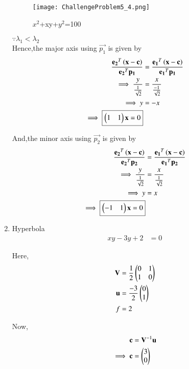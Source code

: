 \documentclass[journal,12pt,twocolumn]{IEEEtran}
\begin{document}
\begin{enumerate}
    \begin{figure}[!ht]
    \centering
    \texttt{[image: ChallengeProblem5\_4.png]}
    \caption{$x^2$+xy+$y^2$=100}
    \label{ex4}	
    \end{figure}
    
    $\because \lambda_1<\lambda_2$ \\
    Hence,the major axis using $\vec{p_1}$ is given by
    \begin{align}
        \frac{\mathbf{e_2}^T\left(\mathbf{x}-\mathbf{c}\right)}{{\mathbf{e_2}^T\mathbf{p_1}}} &= \frac{\mathbf{e_1}^T\left(\mathbf{x}-\mathbf{c}\right)}{{\mathbf{e_1}^T\mathbf{p_1}}}\\
        \implies \frac{y}{\frac{1}{\sqrt{2}}} &= \frac{x}{\frac{-1}{\sqrt{2}}} \\
        \implies y &= -x \\
        \implies \boxed{\begin{pmatrix}1 & 1\end{pmatrix}\mathbf{x} = 0}
    \end{align}
    
    And,the minor axis using $\vec{p_2}$ is given by
    \begin{align}
        \frac{\mathbf{e_2}^T\left(\mathbf{x}-\mathbf{c}\right)}{{\mathbf{e_2}^T\mathbf{p_2}}} &= \frac{\mathbf{e_1}^T\left(\mathbf{x}-\mathbf{c}\right)}{{\mathbf{e_1}^T\mathbf{p_2}}}\\
        \implies \frac{y}{\frac{1}{\sqrt{2}}} &= \frac{x}{\frac{1}{\sqrt{2}}} \\
        \implies y &= x \\
        \implies \boxed{\begin{pmatrix}-1 & 1\end{pmatrix}\mathbf{x} = 0}
    \end{align}
    
    \item Hyperbola
    \begin{align}
        xy-3y+2 &= 0
    \end{align}
    
    Here,
    \begin{align}
    \mathbf{V} &= \frac{1}{2}\begin{pmatrix}0 & 1 \\ 1 & 0\end{pmatrix} \\
    \mathbf{u} &= \frac{-3}{2}\begin{pmatrix}0 \\ 1\end{pmatrix} \\
    f &= 2
    \end{align}

    Now,
    \begin{align}
    \mathbf{c} &= \mathbf{V}^{-1}\mathbf{u}\\
    \implies \mathbf{c} &= \begin{pmatrix}3 \\ 0\end{pmatrix}
    \end{align}


\end{enumerate}
\end{document}
